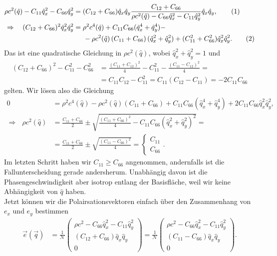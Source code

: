 \documentclass[english, parskip=full]{scrartcl}
\newcommand\numberthis{\addtocounter{equation}{1}\tag{\theequation}}
\newcommand{\kla}{}
\begin{document}
\begin{align*}
\rho c^2(\hat{q}) - C_{11}\hat{q}_x^2 - C_{66} \hat{q}_y^2 &= (C_{12} + C_{66}) \hat{q}_x \hat{q}_y \frac{C_{12} + C_{66}}{\rho c^2(\hat{q}) - C_{66}\hat{q}_x^2 - C_{11} \hat{q}_y^2}\hat{q}_x\hat{q}_y, \numberthis \\
\Rightarrow\ \ \ (C_{12} + C_{66})^2\hat{q}_x^2 \hat{q}_y^2 &= \rho^2 c^4(\hat{q}) + C_{11}C_{66} (\hat{q}_x^4 + \hat{q}_y^4) - \\
&\hspace{0.5cm} - \rho c^2(\hat{q}) \kla\left( C_{11} + C_{66} \right) (\hat{q}_x^2 + \hat{q}_y^2) + (C_{11}^2 + C_{66}^2) \hat{q}_x^2\hat{q}_y^2 . \numberthis
\end{align*}
Das ist eine quadratische Gleichung in $\rho c^2(\hat{q})$, wobei $\hat{q}_x^2 + \hat{q}_y^2 = 1$ und
\begin{align}
(C_{12} + C_{66})^2 - C_{11}^2 - C_{66}^2 &= \frac{(C_{11} + C_{12})^2}{4} - C_{11}^2 - \frac{(C_{11} - C_{12})^2}{4} = \\
&= C_{11}C_{12} - C_{11}^2 = C_{11}(C_{12} - C_{11}) = -2C_{11}C_{66}
\end{align}
gelten.
Wir lösen also die Gleichung
\begin{align}
0 &= \rho^2 c^4(\hat{q}) - \rho c^2(\hat{q}) (C_{11} + C_{66}) + C_{11}C_{66} (\hat{q}_x^4 + \hat{q}_y^4) + 2C_{11}C_{66} \hat{q}_x^2 \hat{q}_y^2,\\
\Rightarrow\ \ \ \rho c^2(\hat{q}) &= \frac{C_{11} + C_{66}}{2} \pm \sqrt{\frac{(C_{11} + C_{66})^2}{4} - C_{11}C_{66} \kla\left(  \hat{q}_x^2 + \hat{q}_y^2 \right)^2} = \\
&= \frac{C_{11} + C_{66}}{2} \pm \sqrt{\frac{(C_{11} - C_{66})^2}{4}} = \begin{cases} C_{11} \\ C_{66} \end{cases}.
\end{align}
Im letzten Schritt haben wir $C_{11} \ge C_{66}$ angenommen, andernfalls ist die Fallunterscheidung gerade andersherum.
Unabhängig davon ist die Phasengeschwindigkeit aber isotrop entlang der Basisfläche, weil wir keine Abhängigkeit von $\hat{q}$ haben.
\\
Jetzt können wir die Polairsationsvektoren einfach über den Zusammenhang von $e_x$ und $e_y$ bestimmen
\begin{align}
\vec{e}(\vec{q}) &= \frac{1}{\mathcal{N}}\begin{pmatrix}
\rho c^2 - C_{66} \hat{q}_x^2 - C_{11} \hat{q}_y^2 \\ 
(C_{12} + C_{66} ) \hat{q}_x \hat{q}_y \\ 
0
\end{pmatrix} = \frac{1}{\mathcal{N}}\begin{pmatrix}
\rho c^2 - C_{66} \hat{q}_x^2 - C_{11} \hat{q}_y^2 \\ 
(C_{11} - C_{66} ) \hat{q}_x \hat{q}_y \\ 
0
\end{pmatrix}.
\end{align}
\end{document}
